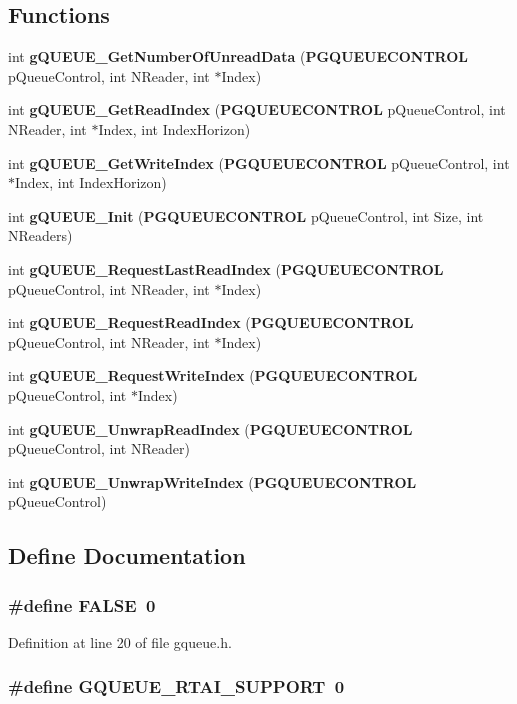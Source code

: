 \subsection*{Functions}
\begin{DoxyCompactItemize}
\item 
int {\bf gQUEUE\_\-GetNumberOfUnreadData} ({\bf PGQUEUECONTROL} pQueueControl, int NReader, int $\ast$Index)
\item 
int {\bf gQUEUE\_\-GetReadIndex} ({\bf PGQUEUECONTROL} pQueueControl, int NReader, int $\ast$Index, int IndexHorizon)
\item 
int {\bf gQUEUE\_\-GetWriteIndex} ({\bf PGQUEUECONTROL} pQueueControl, int $\ast$Index, int IndexHorizon)
\item 
int {\bf gQUEUE\_\-Init} ({\bf PGQUEUECONTROL} pQueueControl, int Size, int NReaders)
\item 
int {\bf gQUEUE\_\-RequestLastReadIndex} ({\bf PGQUEUECONTROL} pQueueControl, int NReader, int $\ast$Index)
\item 
int {\bf gQUEUE\_\-RequestReadIndex} ({\bf PGQUEUECONTROL} pQueueControl, int NReader, int $\ast$Index)
\item 
int {\bf gQUEUE\_\-RequestWriteIndex} ({\bf PGQUEUECONTROL} pQueueControl, int $\ast$Index)
\item 
int {\bf gQUEUE\_\-UnwrapReadIndex} ({\bf PGQUEUECONTROL} pQueueControl, int NReader)
\item 
int {\bf gQUEUE\_\-UnwrapWriteIndex} ({\bf PGQUEUECONTROL} pQueueControl)
\end{DoxyCompactItemize}


\subsection{Define Documentation}
\subsubsection[{FALSE}]{\setlength{\rightskip}{0pt plus 5cm}\#define FALSE~0}\label{gqueue_8h_aa93f0eb578d23995850d61f7d61c55c1}


Definition at line 20 of file gqueue.h.
\subsubsection[{GQUEUE\_\-RTAI\_\-SUPPORT}]{\setlength{\rightskip}{0pt plus 5cm}\#define GQUEUE\_\-RTAI\_\-SUPPORT~0}\label{gqueue_8h_acc22fd2421f798402da9d60eb1306a77}


